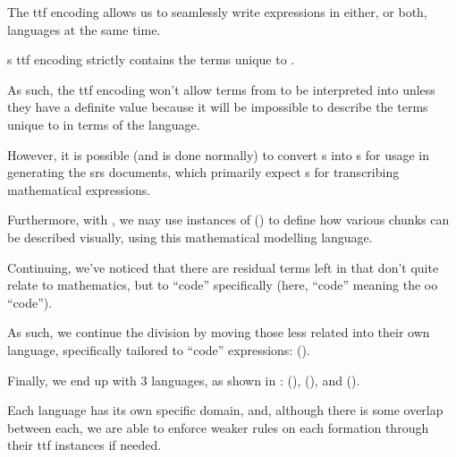 The \acs{ttf} encoding allows us to seamlessly write expressions in either, or
both, languages at the same time. 

\ModelExpr{}s \acs{ttf} encoding strictly contains the terms unique to
\ModelExpr{}.

As such, the \acs{ttf} encoding won't allow terms from \ModelExpr{} to be
interpreted into \Expr{} unless they have a definite value because it will be
impossible to describe the terms unique to \ModelExpr{} in terms of the \Expr{}
language.

However, it is possible (and is done normally) to convert \Expr{}s into
\ModelExpr{}s for usage in generating the \acs{srs} documents, which primarily
expect \ModelExpr{}s for transcribing mathematical expressions.

Furthermore, with \ModelExpr{}, we may use instances of \Express{}
() to define how various chunks can be described
visually, using this mathematical modelling language.

\currentExpressHaskell{}

Continuing, we've noticed that there are residual terms left in \Expr{} that
don't quite relate to mathematics, but to ``code'' specifically (here, ``code''
meaning the \acs{oo} ``code'').

As such, we continue the division by moving those less related into their own
language, specifically tailored to ``code'' expressions: \CodeExpr{} ().



Finally, we end up with 3 languages, as shown in : \Expr{}
(), \ModelExpr{} (), and
\CodeExpr{} ().

Each language has its own specific domain, and, although there is some overlap
between each, we are able to enforce weaker rules on each formation through
their \acs{ttf} instances if needed.
